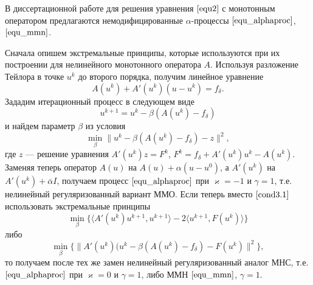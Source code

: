 В диссертационной работе для решения уравнения $\eqref{equ2}$ с монотонным оператором предлагаются немодифицированные $\alpha$-процессы $\eqref{equ_alphaproc}$, $\eqref{equ_mmn}$.

Сначала опишем экстремальные принципы, которые используются при их  построении для нелинейного монотонного оператора $A$. Используя разложение Тейлора в точке $u^k$ до второго порядка, получим линейное уравнение
\begin{equation*}
A(u^k)+A'(u^k)(u-u^k)=f_{\delta}.
\end{equation*}
Зададим итерационный процесс в следующем виде
\begin{equation*}
u^{k+1}=u^k-\beta(A(u^k)-f_{\delta})
\end{equation*}
и найдем параметр $\beta$ из условия
\begin{equation}\label{cond3.1}
\min_{\beta}{\|u^k-\beta(A(u^k)-f_{\delta})-z\|^2},
\end{equation}
где $z$ --- решение уравнения $A'(u^k)z=F^k$, $F^k=f_{\delta}+A'(u^k)u^k-A(u^k)$. Заменяя теперь оператор $A(u)$ на $A(u)+\alpha(u-u^0)$, а $A'(u^k)$ на $A'(u^k)+\bar\alpha I$, получаем процесс $\eqref{equ_alphaproc}$ при $\varkappa=-1$ и $\gamma=1$, т.е. нелинейный регуляризованный вариант ММО. Если теперь вместо $\eqref{cond3.1}$ использовать экстремальные принципы
$$\min_{\beta}\{\langle A'(u^k)u^{k+1},u^{k+1}\rangle-2\langle u^{k+1},F(u^k)\rangle\}$$
либо 
\begin{equation}\label{cond3.2}
\min_{\beta}\{\|A'(u^k)(u^k-\beta(A(u^k)-f_{\delta})-F(u^k)\|^2\},
\end{equation}
то получаем после тех же замен нелинейный регуляризованный аналог МНС, т.е. $\eqref{equ_alphaproc}$ при $\varkappa=0$ и $\gamma=1$, либо ММН $\eqref{equ_mmn}$, $\gamma=1$.


